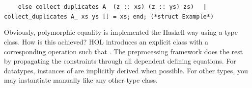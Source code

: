 \begin{isabellebody}
\begin{isamarkuptext}
\verb|    else collect_duplicates A_ (z :: xs) (z :: ys) zs)|\newline%
\verb|  |\verb,|,\verb| collect_duplicates A_ xs ys [] = xs;|\newline%
\newline%
\verb|end; (*struct Example*)|%
\end{isamarkuptext}%
\isamarkuptrue%
%
\endisatagquoteme
{\isafoldquoteme}%
%
\isadelimquoteme
%
\endisadelimquoteme
%
\begin{isamarkuptext}%
\noindent Obviously, polymorphic equality is implemented the Haskell
  way using a type class.  How is this achieved?  HOL introduces
  an explicit class  with a corresponding operation
   such that .
  The preprocessing framework does the rest by propagating the
   constraints through all dependent defining equations.
  For datatypes, instances of  are implicitly derived
  when possible.  For other types, you may instantiate 
  manually like any other type class.


\end{isamarkuptext}
\end{isabellebody}
